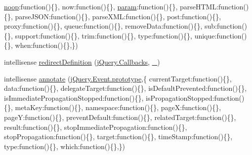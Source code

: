 \begin{DoxyCompactItemize}
\textquotesingle{}\hyperlink{_scripts_2dropzone_8js_a5ee121e2a02829c387f4c02eeca8e38c}{noop}\textquotesingle{}\+:function()\{\}, \textquotesingle{}now\textquotesingle{}\+:function()\{\}, \textquotesingle{}\hyperlink{_scripts_2jquery-1_810_82_8min_8js_ae8915303d11557d1b001bc56b6195251}{param}\textquotesingle{}\+:function()\{\}, \textquotesingle{}parse\+H\+T\+M\+L\textquotesingle{}\+:function()\{\}, \textquotesingle{}parse\+J\+S\+O\+N\textquotesingle{}\+:function()\{\}, \textquotesingle{}parse\+X\+M\+L\textquotesingle{}\+:function()\{\}, \textquotesingle{}post\textquotesingle{}\+:function()\{\}, \textquotesingle{}proxy\textquotesingle{}\+:function()\{\}, \textquotesingle{}queue\textquotesingle{}\+:function()\{\}, \textquotesingle{}remove\+Data\textquotesingle{}\+:function()\{\}, \textquotesingle{}sub\textquotesingle{}\+:function()\{\}, \textquotesingle{}support\textquotesingle{}\+:function()\{\}, \textquotesingle{}trim\textquotesingle{}\+:function()\{\}, \textquotesingle{}type\textquotesingle{}\+:function()\{\}, \textquotesingle{}unique\textquotesingle{}\+:function()\{\}, \textquotesingle{}when\textquotesingle{}\+:function()\{\},\})
\item 
intellisense \hyperlink{jquery-1_810_82_8intellisense_8js_abeba0f4b2ef2a8a655ac517b37c9fc63}{redirect\+Definition} (\hyperlink{jquery-1_810_82_8intellisense_8js_add8d59d25831bb9b171fdbee8a18795b}{j\+Query.\+Callbacks}, \hyperlink{jquery-1_810_82_8intellisense_8js_af58a9af35e2376001e3219aef7e0bda3}{\+\_})
\item 
intellisense \hyperlink{jquery-1_810_82_8intellisense_8js_a55098c3abe028707512d17d570d3486b}{annotate} (\hyperlink{_scripts_2jquery-1_810_82_8js_ab5e5d0976552f788d31448ed049ae4a4}{j\+Query.\+Event.\+prototype},\{ \textquotesingle{}current\+Target\textquotesingle{}\+:function()\{\}, \textquotesingle{}data\textquotesingle{}\+:function()\{\}, \textquotesingle{}delegate\+Target\textquotesingle{}\+:function()\{\}, \textquotesingle{}is\+Default\+Prevented\textquotesingle{}\+:function()\{\}, \textquotesingle{}is\+Immediate\+Propagation\+Stopped\textquotesingle{}\+:function()\{\}, \textquotesingle{}is\+Propagation\+Stopped\textquotesingle{}\+:function()\{\}, \textquotesingle{}meta\+Key\textquotesingle{}\+:function()\{\}, \textquotesingle{}namespace\textquotesingle{}\+:function()\{\}, \textquotesingle{}page\+X\textquotesingle{}\+:function()\{\}, \textquotesingle{}page\+Y\textquotesingle{}\+:function()\{\}, \textquotesingle{}prevent\+Default\textquotesingle{}\+:function()\{\}, \textquotesingle{}related\+Target\textquotesingle{}\+:function()\{\}, \textquotesingle{}result\textquotesingle{}\+:function()\{\}, \textquotesingle{}stop\+Immediate\+Propagation\textquotesingle{}\+:function()\{\}, \textquotesingle{}stop\+Propagation\textquotesingle{}\+:function()\{\}, \textquotesingle{}target\textquotesingle{}\+:function()\{\}, \textquotesingle{}time\+Stamp\textquotesingle{}\+:function()\{\}, \textquotesingle{}type\textquotesingle{}\+:function()\{\}, \textquotesingle{}which\textquotesingle{}\+:function()\{\},\})

\end{DoxyCompactItemize}
